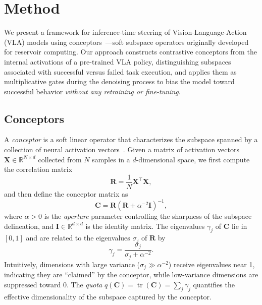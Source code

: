 
\section{Method}
\label{sec:method}

We present a framework for inference-time steering of Vision-Language-Action (VLA) models using conceptors~\citep{jaeger2014controlling}---soft subspace operators originally developed for reservoir computing. Our approach constructs contrastive conceptors from the internal activations of a pre-trained VLA policy, distinguishing subspaces associated with successful versus failed task execution, and applies them as multiplicative gates during the denoising process to bias the model toward successful behavior \emph{without any retraining or fine-tuning}.

\subsection{Conceptors}
\label{sec:conceptors}

A \emph{conceptor} is a soft linear operator that characterizes the subspace spanned by a collection of neural activation vectors~\citep{jaeger2014controlling}. Given a matrix of activation vectors $\mathbf{X} \in \mathbb{R}^{N \times d}$ collected from $N$ samples in a $d$-dimensional space, we first compute the correlation matrix
\begin{equation}
    \mathbf{R} = \frac{1}{N} \mathbf{X}^\top \mathbf{X},
    \label{eq:correlation}
\end{equation}
and then define the conceptor matrix as
\begin{equation}
    \mathbf{C} = \mathbf{R} \left( \mathbf{R} + \alpha^{-2} \mathbf{I} \right)^{-1},
    \label{eq:conceptor}
\end{equation}
where $\alpha > 0$ is the \emph{aperture} parameter controlling the sharpness of the subspace delineation, and $\mathbf{I} \in \mathbb{R}^{d \times d}$ is the identity matrix. The eigenvalues $\gamma_j$ of $\mathbf{C}$ lie in $[0, 1]$ and are related to the eigenvalues $\sigma_j$ of $\mathbf{R}$ by
\begin{equation}
    \gamma_j = \frac{\sigma_j}{\sigma_j + \alpha^{-2}}.
    \label{eq:conceptor_eigenvalues}
\end{equation}
Intuitively, dimensions with large variance ($\sigma_j \gg \alpha^{-2}$) receive eigenvalues near 1, indicating they are ``claimed'' by the conceptor, while low-variance dimensions are suppressed toward 0. The \emph{quota} $q(\mathbf{C}) = \operatorname{tr}(\mathbf{C}) = \sum_j \gamma_j$ quantifies the effective dimensionality of the subspace captured by the conceptor.


